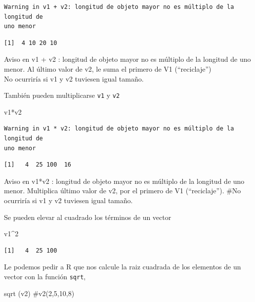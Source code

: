 \documentclass[
  letterpaper,
]{scrbook}
\newenvironment{Shaded}{\begin{snugshade}}{\end{snugshade}}
\newcommand{\CommentTok}[1]{\textcolor[rgb]{0.37,0.37,0.37}{#1}}
\newcommand{\DecValTok}[1]{\textcolor[rgb]{0.68,0.00,0.00}{#1}}
\newcommand{\FunctionTok}[1]{\textcolor[rgb]{0.28,0.35,0.67}{#1}}
\newcommand{\NormalTok}[1]{\textcolor[rgb]{0.00,0.23,0.31}{#1}}
\newcommand{\SpecialCharTok}[1]{\textcolor[rgb]{0.37,0.37,0.37}{#1}}
\begin{document}
\begin{verbatim}
Warning in v1 + v2: longitud de objeto mayor no es múltiplo de la longitud de
uno menor
\end{verbatim}

\begin{verbatim}
[1]  4 10 20 10
\end{verbatim}

Aviso en v1 + v2 : longitud de objeto mayor no es múltiplo de la
longitud de uno menor. Al último valor de v2, le suma el primero de V1
(``reciclaje'')\\
No ocurriría si v1 y v2 tuviesen igual tamaño.

También pueden multiplicarse \texttt{v1} y \texttt{v2}

\begin{Shaded}
\begin{Highlighting}[]
\NormalTok{v1}\SpecialCharTok{*}\NormalTok{v2}
\end{Highlighting}
\end{Shaded}

\begin{verbatim}
Warning in v1 * v2: longitud de objeto mayor no es múltiplo de la longitud de
uno menor
\end{verbatim}

\begin{verbatim}
[1]   4  25 100  16
\end{verbatim}

Aviso en v1*v2 : longitud de objeto mayor no es múltiplo de la longitud
de uno menor. Multiplica último valor de v2, por el primero de V1
(``reciclaje''). \#No ocurriría si v1 y v2 tuviesen igual tamaño.

Se pueden elevar al cuadrado los términos de un vector

\begin{Shaded}
\begin{Highlighting}[]
\NormalTok{v1}\SpecialCharTok{\^{}}\DecValTok{2} 
\end{Highlighting}
\end{Shaded}

\begin{verbatim}
[1]   4  25 100
\end{verbatim}

Le podemos pedir a R que nos calcule la raiz cuadrada de los elementos
de un vector con la función \texttt{sqrt},

\begin{Shaded}
\begin{Highlighting}[]
\FunctionTok{sqrt}\NormalTok{ (v2) }\CommentTok{\#v2(2,5,10,8)}
\end{Highlighting}
\end{Shaded}
\end{document}

